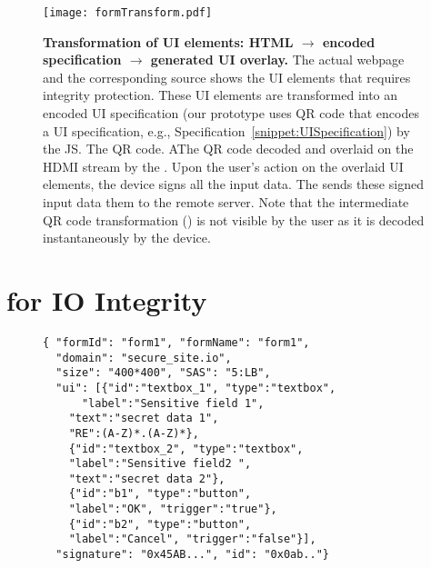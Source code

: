 \begin{figure*}[t]
\centering
\texttt{[image: formTransform.pdf]}
\caption{\textbf{Transformation of UI elements: HTML $\rightarrow$ encoded specification $\rightarrow$ \device generated UI overlay.} \one The actual webpage and the corresponding \html source shows the UI elements that requires integrity protection. \two These UI elements are transformed into an encoded UI specification (our \name prototype uses QR code that encodes a UI specification, e.g., Specification~\ref{snippet:UISpecification}) by the \name JS. The QR code. \three AThe QR code decoded and overlaid on the HDMI stream by the \device. \four Upon the user's action on the overlaid UI elements, the device signs all the input data. \five The \device sends these signed input data them to the remote server. Note that the intermediate QR code transformation (\two) is not visible by the user as it is decoded instantaneously by the device.}
\spacesave
\label{fig:transformation}
\end{figure*}

\section{\name for IO Integrity}
\label{sec:systemDesign}




\begin{figure}[t]
\scriptsize
\begin{lstlisting}[mathescape=true]
{ "formId": "form1", "formName": "form1",
  "domain": "secure_site.io",
  "size": "400*400", "SAS": "5:LB",
  "ui": [{"id":"textbox_1", "type":"textbox", 
      "label":"Sensitive field 1",
    "text":"secret data 1",
    "RE":(A-Z)*.(A-Z)*},
    {"id":"textbox_2", "type":"textbox",
    "label":"Sensitive field2 ",
    "text":"secret data 2"},
    {"id":"b1", "type":"button",
    "label":"OK", "trigger":"true"},    
    {"id":"b2", "type":"button",
    "label":"Cancel", "trigger":"false"}],
  "signature": "0x45AB...", "id": "0x0ab.."}
\end{lstlisting}
\spacesave
\end{figure}

